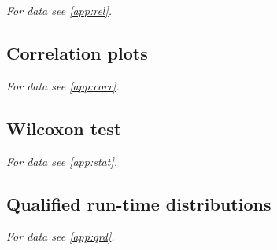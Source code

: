 \emph{For data see \ref{app:rel}.}

\subsection{Correlation plots}

\emph{For data see \ref{app:corr}.}

\subsection{Wilcoxon test}

\emph{For data see \ref{app:stat}.}

\subsection{Qualified run-time distributions}

\emph{For data see \ref{app:qrd}.}